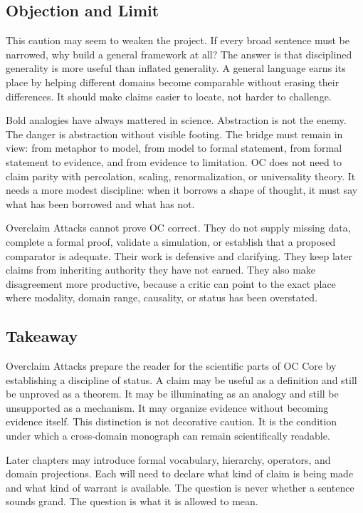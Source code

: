 \documentclass[11pt,a4paper,openany]{book}
\begin{document}
\subsection{Objection and Limit}
This caution may seem to weaken the project. If every broad sentence must be narrowed, why build a general framework at all? The answer is that disciplined generality is more useful than inflated generality. A general language earns its place by helping different domains become comparable without erasing their differences. It should make claims easier to locate, not harder to challenge. \cite{grimmett_percolation,goldenfeld_lectures}\par
Bold analogies have always mattered in science. Abstraction is not the enemy. The danger is abstraction without visible footing. The bridge must remain in view: from metaphor to model, from model to formal statement, from formal statement to evidence, and from evidence to limitation. OC does not need to claim parity with percolation, scaling, renormalization, or universality theory. It needs a more modest discipline: when it borrows a shape of thought, it must say what has been borrowed and what has not.\par
Overclaim Attacks cannot prove OC correct. They do not supply missing data, complete a formal proof, validate a simulation, or establish that a proposed comparator is adequate. Their work is defensive and clarifying. They keep later claims from inheriting authority they have not earned. They also make disagreement more productive, because a critic can point to the exact place where modality, domain range, causality, or status has been overstated.\par
\subsection{Takeaway}
Overclaim Attacks prepare the reader for the scientific parts of OC Core by establishing a discipline of status. A claim may be useful as a definition and still be unproved as a theorem. It may be illuminating as an analogy and still be unsupported as a mechanism. It may organize evidence without becoming evidence itself. This distinction is not decorative caution. It is the condition under which a cross-domain monograph can remain scientifically readable. \cite{grimmett_percolation,goldenfeld_lectures}\par
Later chapters may introduce formal vocabulary, hierarchy, operators, and domain projections. Each will need to declare what kind of claim is being made and what kind of warrant is available. The question is never whether a sentence sounds grand. The question is what it is allowed to mean.\par
\end{document}
